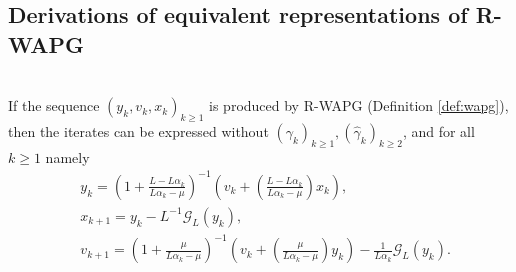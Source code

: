 \documentclass[12pt]{article}
\begin{document}
    \subsection{Derivations of equivalent representations of R-WAPG}
        \begin{proposition}\label{prop:wapg-first-equivalent-repr}\;\\
            If the sequence $(y_k, v_k, x_k)_{k \ge 1}$ is produced by R-WAPG (Definition \ref{def:wapg}),
            then the iterates can be expressed without $(\gamma_k)_{k \ge1},(\hat \gamma_k)_{k \ge 2}$, and for all $k\ge 1$ namely
            \begin{align}
                & y_{k} =
                \left(
                    1 + \frac{L - L\alpha_{k}}{L\alpha_{k} - \mu}
                \right)^{-1}
                \left(
                    v_{k} +
                    \left(\frac{L - L\alpha_{k}}{L\alpha_{k} - \mu} \right) x_{k}
                \right), \label{eqn:rwapg-first-equiv-form-eqn-1}
                \\
                & x_{k + 1} =
                y_k - L^{-1} \mathcal G_L (y_k),
                \\
                & v_{k + 1} =
                \left(
                    1 + \frac{\mu}{L \alpha_k - \mu}
                \right)^{-1}
                \left(
                    v_k +
                    \left(\frac{\mu}{L \alpha_k - \mu}\right) y_k
                \right) - \frac{1}{L\alpha_{k}}\mathcal G_L (y_k).
                \label{eqn:rwapg-first-equiv-form-eqn-2}
            \end{align}
        \end{proposition}
\end{document}
